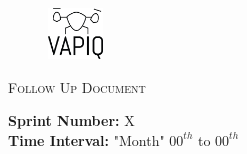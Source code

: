 \documentclass{article}
\begin{document}
\begin{figure}
\begin{center}
\includegraphics[width=0.13\textwidth]{VAPIQ-PICTURES/Logo2_Tilted.png} %
\advance{}
\end{center}
\end{figure}
\begin{center}
\textsc{\Huge Follow Up Document}%
\end{center}
\vspace*{1.5 cm}
\textbf{Sprint Number:} \quad X \\
\textbf{Time Interval:} \quad "Month" $00^{th}$ to $00^{th}$ \\  %
\end{document}
